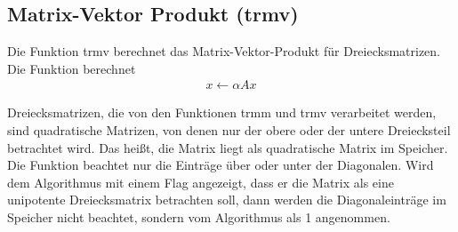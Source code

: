 \subsection{Matrix-Vektor Produkt (trmv)} \label{fkt:trmv}
Die Funktion \glqq trmv\grqq{} berechnet das Matrix-Vektor-Produkt für Dreiecksmatrizen.
Die Funktion berechnet
\begin{align}
x \leftarrow \alpha  Ax %
\end{align}


Dreiecksmatrizen, die von den Funktionen \glqq trmm\grqq{} und \glqq trmv\grqq{} verarbeitet werden, sind quadratische Matrizen, von denen nur der obere oder der untere Dreiecksteil betrachtet wird.
Das heißt, die Matrix liegt als quadratische Matrix im Speicher. Die Funktion beachtet nur die Einträge über oder unter der Diagonalen.
Wird dem Algorithmus mit einem Flag angezeigt, dass 
er die Matrix als eine unipotente Dreiecksmatrix betrachten soll,
dann werden die Diagonaleinträge im Speicher nicht beachtet, sondern vom Algorithmus als 1 angenommen. \cite{blast}


